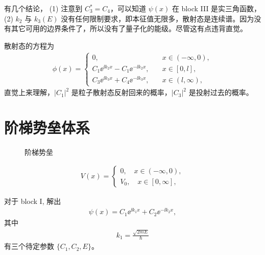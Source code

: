 有几个结论，
(1) 注意到 $C_3^* = C_4$，可以知道 $\psi(x)$ 在 block III 是实三角函数，
(2) $k_2$ 与 $k_3(E)$ 没有任何限制要求，即本征值无限多，散射态是连续谱。因为没有其它可用的边界条件了，所以没有了量子化的能级。尽管这有点违背直觉。


散射态的方程为
\begin{eqnarray}
    \phi (x) = \begin{cases}
        0, \quad &x \in (-\infty, 0), \\
        C_1 \ee^{\ii k_2 x} - C_1 \ee^{-\ii k_2 x}, \quad &x \in [0,l], \\
        C_3 \ee^{\ii k_3 x} + C_4 \ee^{-\ii k_3 x}, \quad &x \in (l, \infty),
    \end{cases}
\end{eqnarray}
直觉上来理解，$|C_1|^2$ 是粒子散射态反射回来的概率，$|C_3|^2$ 是投射过去的概率。


\section{阶梯势垒体系}
\begin{figure}[tp]\centering
\caption{阶梯势垒}
\end{figure}
\begin{eqnarray}
    V(x) = 
\begin{cases}
    0, \quad x\in(-\infty, 0), \\
    V_0, \quad x\in[0, \infty],
\end{cases}
\end{eqnarray}

对于 block I, 解出
\begin{eqnarray}
    \psi(x) = C_1 \ee^{\ii k _1 x} + C_2 \ee^{- \ii k_2 x},
\end{eqnarray}
其中
\begin{eqnarray}
    k_1 = \frac{\sqrt{2mE}}{\hbar}
\end{eqnarray}
有三个待定参数 $\{C_1, C_2, E\}$。

